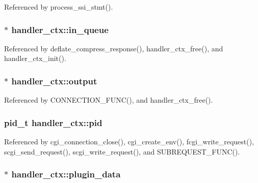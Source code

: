 Referenced by process\-\_\-ssi\-\_\-stmt().

\hypertarget{structhandler__ctx_ac7647b793ea688f3b3e74a02ba3115fa}{
\subsubsection[{in\-\_\-queue}]{$\ast$ handler\-\_\-ctx\-::in\-\_\-queue}}\label{structhandler__ctx_ac7647b793ea688f3b3e74a02ba3115fa}


Referenced by deflate\-\_\-compress\-\_\-response(), handler\-\_\-ctx\-\_\-free(), and handler\-\_\-ctx\-\_\-init().

\hypertarget{structhandler__ctx_a5306d846e094dda17cdf4290647a2efb}{
\subsubsection[{output}]{$\ast$ handler\-\_\-ctx\-::output}}\label{structhandler__ctx_a5306d846e094dda17cdf4290647a2efb}


Referenced by C\-O\-N\-N\-E\-C\-T\-I\-O\-N\-\_\-\-F\-U\-N\-C(), and handler\-\_\-ctx\-\_\-free().

\hypertarget{structhandler__ctx_a6e0de4aab03a623effbf0a5721982c46}{
\subsubsection[{pid}]{\setlength{\rightskip}{0pt plus 5cm}pid\-\_\-t handler\-\_\-ctx\-::pid}}\label{structhandler__ctx_a6e0de4aab03a623effbf0a5721982c46}


Referenced by cgi\-\_\-connection\-\_\-close(), cgi\-\_\-create\-\_\-env(), fcgi\-\_\-write\-\_\-request(), scgi\-\_\-send\-\_\-request(), scgi\-\_\-write\-\_\-request(), and S\-U\-B\-R\-E\-Q\-U\-E\-S\-T\-\_\-\-F\-U\-N\-C().

\hypertarget{structhandler__ctx_a04c4044ac96d072dc2eba4f3cbcf71ed}{
\subsubsection[{plugin\-\_\-data}]{ $\ast$ handler\-\_\-ctx\-::plugin\-\_\-data}}\label{structhandler__ctx_a04c4044ac96d072dc2eba4f3cbcf71ed}


